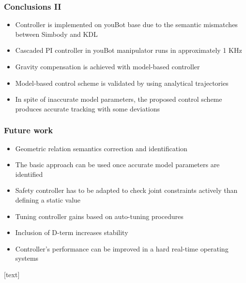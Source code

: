 \documentclass{beamer}
\begin{document}
\begin{frame}
	\frametitle{Conclusions II}
	\begin{itemize}
		\item Controller is implemented on youBot base due to the semantic mismatches between Simbody and KDL
		\item Cascaded PI controller in youBot manipulator runs in approximately 1 KHz
		\item Gravity compensation is achieved with model-based controller
		\item Model-based control scheme is validated by using analytical trajectories
		\item In spite of inaccurate model parameters, the proposed control scheme produces accurate tracking with some deviations 
	\end{itemize}
\end{frame}
\begin{frame}
\frametitle{Future work}
\begin{itemize}
	\item Geometric relation semantics correction and identification 
	\item The basic approach can be used once accurate model parameters are identified
	\item Safety controller has to be adapted to check joint constraints actively than defining a static value
	\item Tuning controller gains based on auto-tuning procedures
	\item Inclusion of D-term increases stability 
	\item Controller's performance can be improved in a hard real-time operating systems
\end{itemize}
\end{frame}

[text]
\end{document}
